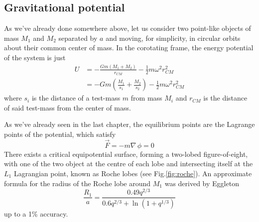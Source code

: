 \subsection{Gravitational potential}
As we've already done somewhere above, let us consider two point-like objects of mass $M_{1}$ and $M_{2}$ separated by $a$ and moving, for simplicity, in circular orbits about their common center of mass. In the corotating frame, the energy potential of the system is just 
\begin{align*}
    U &= -\frac{Gm(M_{1}+M_{2})}{r_{CM}}-\frac{1}{2}m\omega^{2}r_{CM}^{2}\\
    &= -Gm\left(\frac{M_{1}}{s_{1}}+\frac{M_{2}}{s_{2}}\right)-\frac{1}{2}m\omega^{2}r_{CM}^{2}
\end{align*}
where $s_{i}$ is the distance of a test-mass $m$ from mass $M_{i}$ and $r_{CM}$ is the distance of said test-mass from the center of mass.
\par As we've already seen in the last chapter, the equilibrium points are the Lagrange points of the potential, which satisfy 
\begin{equation*}
    \vec{F} = -m\nabla\,\phi = 0
\end{equation*}
There exists a critical equipotential surface, forming a two-lobed ﬁgure-of-eight, with one of the two object at the centre of each lobe and intersecting itself at the $L_{1}$ Lagrangian point, known as Roche lobes (see Fig.\ref{fig:roche}). An approximate formula for the radius of the Roche lobe around $M_{1}$ was derived by Eggleton 
\begin{equation*}
    \frac{R_{1}}{a} = \frac{0.49q^{2/3}}{0.6q^{2/3}+\ln(1+q^{1/3})}
\end{equation*}
up to a 1\% accuracy.
